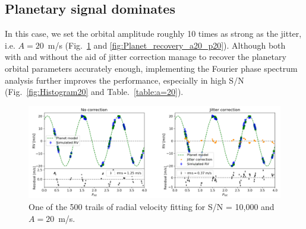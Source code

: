 \subsection{Planetary signal dominates}

In this case, we set the orbital amplitude roughly 10 times as strong as the jitter, i.e. $A = 20$~m/s (Fig.~\ref{fig:Planet_recovery_10000_p20} and \ref{fig:Planet_recovery_a20_p20}). Although both with and without the aid of jitter correction manage to recover the planetary orbital parameters accurately enough, implementing the Fourier phase spectrum analysis further improves the performance, especially in high S/N (Fig.~\ref{fig:Histogram20} and Table.~\ref{table:a=20}). 

\begin{figure}[tbp]	
\centering
\includegraphics[width = 0.99 \linewidth]
{./Figures/Methods/Fitting_p20j2sn10000.png}
\caption[Planet recovery ($A = 20$~m/s, S/N = 10,000)]
{One of the 500 trails of radial velocity fitting for S/N = 10,000 and $A = 20$~m/s.}
\label{fig:Planet_recovery_10000_p20}
\end{figure}    
